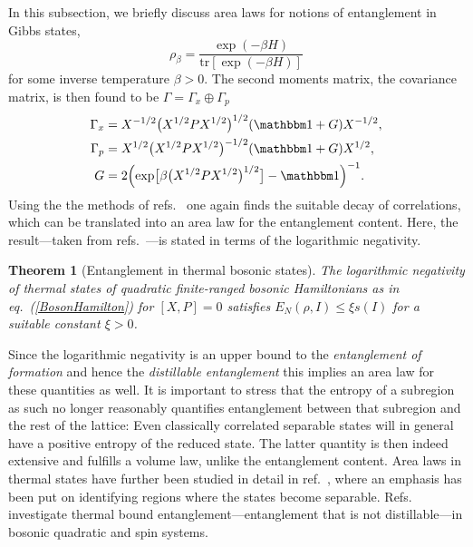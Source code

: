 \documentclass[12pt, rmp,floatfix,epsfig,graphics]{revtex4} %
\newtheorem{theorem}{Theorem}
\begin{document}
In this subsection, we briefly discuss area laws for notions of 
entanglement in Gibbs states,
\begin{equation*}
        \rho_\beta=\frac{\exp(-\beta {H})}{\text{tr}[\exp(-\beta {H})]}
\end{equation*}
for some inverse temperature $\beta>0$. The second moments matrix, the 
covariance matrix, is then found to be $\Gamma=\Gamma_x\oplus\Gamma_p$ 
\cite{Area2}
\begin{equation*}
\begin{split}
\Gamma_x&=X^{-1/2}\bigl(X^{1/2}PX^{1/2}\bigr)^{1/2}(\id + G)X^{-1/2},\\
\Gamma_p&=X^{1/2}\bigl(X^{1/2}PX^{1/2}\bigr)^{-1/2}(\id + G)X^{1/2},\\
G&=2\Bigl(\exp\bigl[\beta\bigl(X^{1/2}PX^{1/2}\bigr)^{1/2}\bigr]-\id\Bigr)^{-1}.
\end{split}
\end{equation*}
Using the the methods of refs.\ \cite{Benzi,Area2} one again finds 
the suitable decay of correlations, which can be translated into 
an area law for the entanglement content. Here, the result---taken 
from refs.\ \cite{Area2,Area3}---is stated in terms of the logarithmic 
negativity. 

\begin{theorem}[Entanglement in thermal bosonic states]
The logarithmic 
negativity of thermal states of quadratic finite-ranged
bosonic Hamiltonians as in eq.\ (\ref{BosonHamilton}) for $[X,P]=0$ satisfies
$E_{N}(\rho,I)\leq \xi s(I)$ for a suitable constant $\xi>0$.
\end{theorem}

Since the logarithmic negativity is an upper bound to the
{\it entanglement of formation} and hence the
{\it distillable entanglement} \cite{Horodecki,InHouseReview}
this implies an area law for these quantities as well.
It is important to stress that the entropy of a subregion 
as such no longer reasonably quantifies entanglement between
that subregion and the rest of the lattice: Even classically 
correlated separable states will in general have a positive 
entropy of the reduced state. The latter quantity is then 
indeed extensive and fulfills a volume law, unlike the entanglement 
content. Area laws in thermal states have further been studied 
in detail in ref.\ \cite{Janet}, where an emphasis has been put
on identifying regions where the states become separable.
Refs.\ \cite{AcinThermal,AcinThermal2} 
investigate thermal bound entanglement---entanglement that is not
distillable---in bosonic quadratic and spin systems. 
\end{document}
